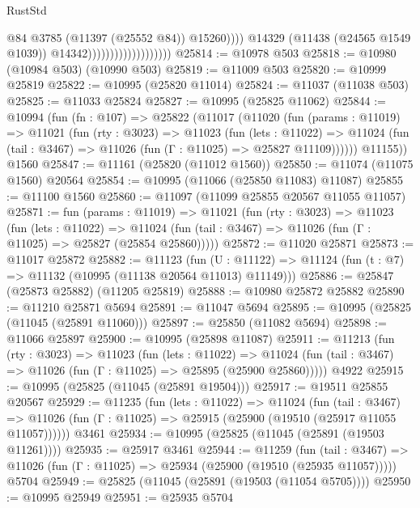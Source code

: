 \begin{lexlean}{RustStd}
\begin{coremodule}
                                                  @84
                                                  @3785
                                                  (@11397 (@25552 @84))
                                                  @15260))))
                                          @14329
                                          (@11438 (@24565 @1549 @1039))
                                          @14342)))))))))))))))))))
@25814 := @10978 @503
@25818 := @10980 (@10984 @503) (@10990 @503)
@25819 := @11009 @503
@25820 := @10999 @25819
@25822 := @10995 (@25820 @11014)
@25824 := @11037 (@11038 @503)
@25825 := @11033 @25824
@25827 := @10995 (@25825 @11062)
@25844 := @10994
    (fun (fn : @107) =>
    @25822
      (@11017
        (@11020
          (fun (params : @11019) =>
          @11021
            (fun (rty : @3023) =>
            @11023
              (fun (lets : @11022) =>
              @11024 (fun (tail : @3467) => @11026 (fun (Γ : @11025) => @25827 @11109))))))
        @11155))
    @1560
@25847 := @11161 (@25820 (@11012 @1560))
@25850 := @11074 (@11075 @1560) @20564
@25854 := @10995 (@11066 (@25850 @11083) @11087)
@25855 := @11100 @1560
@25860 := @11097 (@11099 @25855 @20567 @11055 @11057)
@25871 := fun (params : @11019) =>
  @11021
    (fun (rty : @3023) =>
    @11023
      (fun (lets : @11022) =>
      @11024 (fun (tail : @3467) => @11026 (fun (Γ : @11025) => @25827 (@25854 @25860)))))
@25872 := @11020 @25871
@25873 := @11017 @25872
@25882 := @11123
    (fun (U : @11122) => @11124 (fun (t : @7) => @11132 (@10995 (@11138 @20564 @11013) @11149)))
@25886 := @25847 (@25873 @25882) (@11205 @25819)
@25888 := @10980 @25872 @25882
@25890 := @11210 @25871 @5694
@25891 := @11047 @5694
@25895 := @10995 (@25825 (@11045 (@25891 @11060)))
@25897 := @25850 (@11082 @5694)
@25898 := @11066 @25897
@25900 := @10995 (@25898 @11087)
@25911 := @11213
    (fun (rty : @3023) =>
    @11023
      (fun (lets : @11022) =>
      @11024 (fun (tail : @3467) => @11026 (fun (Γ : @11025) => @25895 (@25900 @25860)))))
    @4922
@25915 := @10995 (@25825 (@11045 (@25891 @19504)))
@25917 := @19511 @25855 @20567
@25929 := @11235
    (fun (lets : @11022) =>
    @11024
      (fun (tail : @3467) =>
      @11026 (fun (Γ : @11025) => @25915 (@25900 (@19510 (@25917 @11055 @11057))))))
    @3461
@25934 := @10995 (@25825 (@11045 (@25891 (@19503 @11261))))
@25935 := @25917 @3461
@25944 := @11259
    (fun (tail : @3467) => @11026 (fun (Γ : @11025) => @25934 (@25900 (@19510 (@25935 @11057)))))
    @5704
@25949 := @25825 (@11045 (@25891 (@19503 (@11054 @5705))))
@25950 := @10995 @25949
@25951 := @25935 @5704

\end{coremodule}
\end{lexlean}
